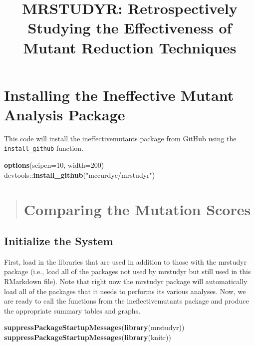 \documentclass[]{article}
\title{MRSTUDYR: Retrospectively Studying the Effectiveness of Mutant Reduction
Techniques}
\author{}
\date{}
\newenvironment{Shaded}{}{}
\newcommand{\KeywordTok}[1]{\textcolor[rgb]{0.00,0.44,0.13}{\textbf{{#1}}}}
\newcommand{\DataTypeTok}[1]{\textcolor[rgb]{0.56,0.13,0.00}{{#1}}}
\newcommand{\DecValTok}[1]{\textcolor[rgb]{0.25,0.63,0.44}{{#1}}}
\newcommand{\StringTok}[1]{\textcolor[rgb]{0.25,0.44,0.63}{{#1}}}
\newcommand{\NormalTok}[1]{{#1}}
\begin{document}
\maketitle

\section{Installing the Ineffective Mutant Analysis
Package}\label{installing-the-ineffective-mutant-analysis-package}

This code will install the ineffectivemutants package from GitHub using
the \texttt{install\_github} function.

\begin{Shaded}
\begin{Highlighting}[]
\KeywordTok{options}\NormalTok{(}\DataTypeTok{scipen=}\DecValTok{10}\NormalTok{, }\DataTypeTok{width=}\DecValTok{200}\NormalTok{)}
\NormalTok{devtools::}\KeywordTok{install_github}\NormalTok{(}\StringTok{"mccurdyc/mrstudyr"}\NormalTok{)}
\end{Highlighting}
\end{Shaded}

\begin{quote}
\section{Comparing the Mutation
Scores}\label{comparing-the-mutation-scores}
\end{quote}

\subsection{Initialize the System}\label{initialize-the-system}

First, load in the libraries that are used in addition to those with the
mrstudyr package (i.e., load all of the packages not used by mrstudyr
but still used in this RMarkdown file). Note that right now the mrstudyr
package will automatically load all of the packages that it needs to
performs its various analyses. Now, we are ready to call the functions
from the ineffectivemutants package and produce the appropriate summary
tables and graphs.

\begin{Shaded}
\begin{Highlighting}[]
\KeywordTok{suppressPackageStartupMessages}\NormalTok{(}\KeywordTok{library}\NormalTok{(mrstudyr))}
\KeywordTok{suppressPackageStartupMessages}\NormalTok{(}\KeywordTok{library}\NormalTok{(knitr))}
\end{Highlighting}
\end{Shaded}
\end{document}
